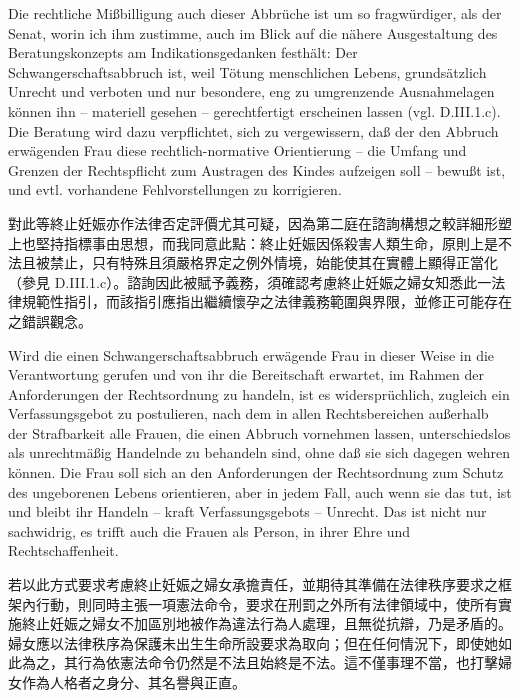 \documentclass[12pt]{article}
\begin{document}
\begin{sourcepara}[title={原文SondervotumB.324}]
Die rechtliche Mißbilligung auch dieser Abbrüche ist um so fragwürdiger, als der Senat, worin ich ihm zustimme, auch im Blick auf die nähere Ausgestaltung des Beratungskonzepts am Indikationsgedanken festhält: Der Schwangerschaftsabbruch ist, weil Tötung menschlichen Lebens, grundsätzlich Unrecht und verboten und nur besondere, eng zu umgrenzende Ausnahmelagen können ihn -- materiell gesehen -- gerechtfertigt erscheinen lassen (vgl. D.III.1.c). Die Beratung wird dazu verpflichtet, sich zu vergewissern, daß der den Abbruch erwägenden Frau diese rechtlich-normative Orientierung -- die Umfang und Grenzen der Rechtspflicht zum Austragen des Kindes aufzeigen soll -- bewußt ist, und evtl. vorhandene Fehlvorstellungen zu korrigieren.
\end{sourcepara}
\begin{transpara}
對此等終止妊娠亦作法律否定評價尤其可疑，因為第二庭在諮詢構想之較詳細形塑上也堅持指標事由思想，而我同意此點：終止妊娠因係殺害人類生命，原則上是不法且被禁止，只有特殊且須嚴格界定之例外情境，始能使其在實體上顯得正當化（參見 D.III.1.c）。諮詢因此被賦予義務，須確認考慮終止妊娠之婦女知悉此一法律規範性指引，而該指引應指出繼續懷孕之法律義務範圍與界限，並修正可能存在之錯誤觀念。
\end{transpara}

\begin{sourcepara}[title={原文SondervotumB.325}]
Wird die einen Schwangerschaftsabbruch erwägende Frau in dieser Weise in die Verantwortung gerufen und von ihr die Bereitschaft erwartet, im Rahmen der Anforderungen der Rechtsordnung zu handeln, ist es widersprüchlich, zugleich ein Verfassungsgebot zu postulieren, nach dem in allen Rechtsbereichen außerhalb der Strafbarkeit alle Frauen, die einen Abbruch vornehmen lassen, unterschiedslos als unrechtmäßig Handelnde zu behandeln sind, ohne daß sie sich dagegen wehren können. Die Frau soll sich an den Anforderungen der Rechtsordnung zum Schutz des ungeborenen Lebens orientieren, aber in jedem Fall, auch wenn sie das tut, ist und bleibt ihr Handeln -- kraft Verfassungsgebots -- Unrecht. Das ist nicht nur sachwidrig, es trifft auch die Frauen als Person, in ihrer Ehre und Rechtschaffenheit.
\end{sourcepara}
\begin{transpara}
若以此方式要求考慮終止妊娠之婦女承擔責任，並期待其準備在法律秩序要求之框架內行動，則同時主張一項憲法命令，要求在刑罰之外所有法律領域中，使所有實施終止妊娠之婦女不加區別地被作為違法行為人處理，且無從抗辯，乃是矛盾的。婦女應以法律秩序為保護未出生生命所設要求為取向；但在任何情況下，即使她如此為之，其行為依憲法命令仍然是不法且始終是不法。這不僅事理不當，也打擊婦女作為人格者之身分、其名譽與正直。
\end{transpara}
\end{document}
